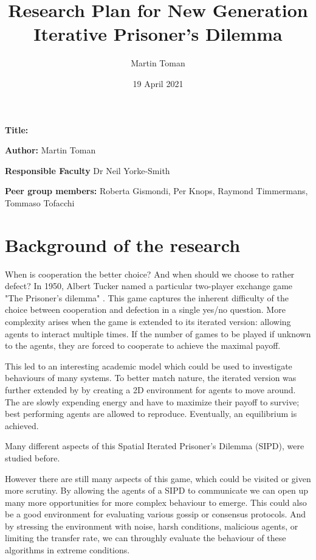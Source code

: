 \documentclass[english]{article}
\title{Research Plan for New Generation Iterative Prisoner's Dilemma}
\author{Martin Toman}
\date{19 April 2021}
\newcommand{\namelistlabel}[1]{\mbox{#1}\hfil}
\newenvironment{namelist}[1]{%
\begin{list}{}{
  \let\makelabel\namelistlabel
  \settowidth{\labelwidth}{#1}
  \setlength{\leftmargin}{1.1\labelwidth}
}}{%
\end{list}}
\begin{document}
\maketitle
\begin{namelist}{}
\item[{\bf Title:}]
\item[{\bf Author:}]
  Martin Toman
\item[{\bf Responsible Faculty}]
  Dr Neil Yorke-Smith
\item[{\bf Peer group members:}]
  Roberta Gismondi,
  Per Knops,
  Raymond Timmermans,
  Tommaso Tofacchi
\end{namelist}



\section*{Background of the research}
When is cooperation the better choice? And when should we choose to rather defect?
In 1950, Albert Tucker named a particular two-player exchange game "The Prisoner’s dilemma" \citep{sep-prisoner-dilemma}.
This game captures the inherent difficulty of the choice between cooperation and defection in a single yes/no question.
More complexity arises when the game is extended to its iterated version: allowing agents to interact multiple times. If the number of games to be played if unknown to the agents, they are forced to cooperate to achieve the maximal payoff.

This led to an interesting academic model which could be used to investigate behaviours of many systems.
To better match nature, the iterated version was further extended by \citet{smaldino} by creating a 2D environment for agents to move around. The are slowly expending energy and have to maximize their payoff to survive; best performing agents are allowed to reproduce. Eventually, an equilibrium is achieved.

Many different aspects of this Spatial Iterated Prisoner’s Dilemma (SIPD), were studied before. 


However there are still many aspects of this game, which could be visited or given more scrutiny.
By allowing the agents of a SIPD to communicate we can open up many more opportunities for more complex behaviour to emerge.
This could also be a good environment for evaluating various gossip or consensus protocols. 
And by stressing the environment with noise, harsh conditions, malicious agents, or limiting the transfer rate, we can throughly evaluate the behaviour of these algorithms in extreme conditions.
\end{document}
